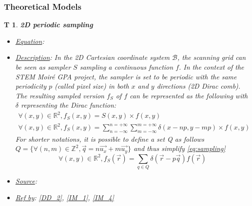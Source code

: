 \documentclass[12pt]{article}
\newcommand{\progname}{STEM Moir{\'e} GPA}
\newtheorem{T}{T}
\begin{document}
\subsubsection{Theoretical Models}\label{sec_theoretical}

\begin{T}
\label{T_1}
\noindent\colorbox{shadecolorT}{\normalfont \textbf{2D periodic sampling}}
\normalfont
\begin{itemize}
\item \underline{Equation}: 
\item \underline{Description}: In the 2D Cartesian coordinate system $\mathcal{B}$, the scanning grid can be seen as sampler $S$ sampling a continuous function $f$. In the context of the \progname{} project, the sampler is set to be periodic with the same periodicity $p$ (called pixel size) in both $x$ and $y$ directions (2D Dirac comb). The resulting sampled version $f_S$ of $f$ can be represented as the following with $\delta$ representing the Dirac function:
\begin{equation}
\begin{gathered}
\forall (x,y) \in \mathbb{R}^{2}, f_S(x,y)=S(x,y)\times f(x,y) \\
\forall (x,y) \in \mathbb{R}^{2}, f_S(x,y)=\sum_{n=-\infty}^{n=+\infty}\sum_{m=-\infty}^{m=+\infty}\delta(x-np,y-mp)\times f(x,y)
\end{gathered}
\label{eq:sampling}
\end{equation}
For shorter notations, it is possible to define a set Q as follows $Q=\{\forall (n,m) \in \mathbb{Z}^{2}, \vec{q}=n\vec{u_x}+m\vec{u_y}\}$ and thus simplify \cref{eq:sampling}
\begin{equation}
\forall (x,y) \in \mathbb{R}^{2}, f_S(\vec{r})=\sum_{q\in Q}\delta(\vec{r}-p\vec{q}) f(\vec{r})
\label{eq:sampling_simplified}
\end{equation}
\item \underline{Source}: \cite{Gonzalez_1992}
\item \underline{Ref by}: \cref{DD_2}, \cref{IM_1}, \cref{IM_4}
\end{itemize}
\end{T}
\end{document}
